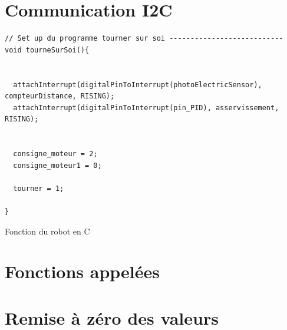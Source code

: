 \documentclass[
	a4paper,									%
	11pt,										%
	twoside,									%
	openright,									%
	notitlepage,									%
	parskip=half,								%
]{scrreprt}										%
\begin{document}
\section{Communication I2C}


\begin{listing}[!ht]
\begin{verbatim}
// Set up du programme tourner sur soi ---------------------------
void tourneSurSoi(){

  
  attachInterrupt(digitalPinToInterrupt(photoElectricSensor), compteurDistance, RISING);
  attachInterrupt(digitalPinToInterrupt(pin_PID), asservissement, RISING);  

 
  consigne_moteur = 2;
  consigne_moteur1 = 0;

  tourner = 1;

}
\end{verbatim}
\caption{Fonction du robot en C}
\label{listing:2}
\end{listing}


\section{Fonctions appelées}



\section{Remise à zéro des valeurs}
\end{document}
